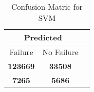 \begin{table}[] 
\caption{Confusion Matric for SVM} 
\label{Table: Prediction Accuracy-NoneSVMDecisionTrees100EKF-ignoreReflection100.9EKF-top2-Reflection} 
\centering 
\begin{tabular} 
 {@{}ccc@{}} 
\toprule 
\multicolumn{2}{c}{\textbf{Predicted}}
 \\ \midrule 
\multicolumn{1}{|c|}{Failure} & 
\multicolumn{1}{c|}{No Failure}
 \\ \midrule 
\multicolumn{1}{|c|}{\color{green}\textbf{123669}} & 
\multicolumn{1}{c|}{\color{green}\textbf{33508}}
 \\ \midrule 
\multicolumn{1}{|c|}{\color{red}\textbf{7265}} & 
\multicolumn{1}{c|}{\color{red}\textbf{5686}}
 \\ \bottomrule 
\end{tabular} 
\end{table} 
